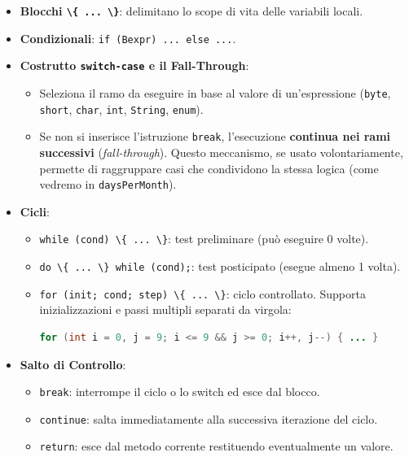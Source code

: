 \documentclass[11pt,a4paper]{article}
\newcommand{\passthrough}[1]{#1}
\providecommand{\tightlist}{\setlength{\itemsep}{0pt}\setlength{\parskip}{0pt}}
\begin{document}
\begin{itemize}
\tightlist
\item
  \textbf{Blocchi \passthrough{\lstinline!\{ ... \}!}}: delimitano lo
  scope di vita delle variabili locali.
\item
  \textbf{Condizionali}:
  \passthrough{\lstinline!if (Bexpr) ... else ...!}.
\item
  \textbf{Costrutto \passthrough{\lstinline!switch-case!} e il
  Fall-Through}:

  \begin{itemize}
  \tightlist
  \item
    Seleziona il ramo da eseguire in base al valore di un'espressione
    (\passthrough{\lstinline!byte!}, \passthrough{\lstinline!short!},
    \passthrough{\lstinline!char!}, \passthrough{\lstinline!int!},
    \passthrough{\lstinline!String!}, \passthrough{\lstinline!enum!}).
  \item
    Se non si inserisce l'istruzione \passthrough{\lstinline!break!},
    l'esecuzione \textbf{continua nei rami successivi}
    (\emph{fall-through}). Questo meccanismo, se usato volontariamente,
    permette di raggruppare casi che condividono la stessa logica (come
    vedremo in \passthrough{\lstinline!daysPerMonth!}).
  \end{itemize}
\item
  \textbf{Cicli}:

  \begin{itemize}
  \item
    \passthrough{\lstinline!while (cond) \{ ... \}!}: test preliminare
    (può eseguire 0 volte).
  \item
    \passthrough{\lstinline!do \{ ... \} while (cond);!}: test
    posticipato (esegue almeno 1 volta).
  \item
    \passthrough{\lstinline!for (init; cond; step) \{ ... \}!}: ciclo
    controllato. Supporta inizializzazioni e passi multipli separati da
    virgola:

\begin{lstlisting}[language=Java]
for (int i = 0, j = 9; i <= 9 && j >= 0; i++, j--) { ... }
\end{lstlisting}
  \end{itemize}
\item
  \textbf{Salto di Controllo}:

  \begin{itemize}
  \tightlist
  \item
    \passthrough{\lstinline!break!}: interrompe il ciclo o lo switch ed
    esce dal blocco.
  \item
    \passthrough{\lstinline!continue!}: salta immediatamente alla
    successiva iterazione del ciclo.
  \item
    \passthrough{\lstinline!return!}: esce dal metodo corrente
    restituendo eventualmente un valore.
  \end{itemize}
\end{itemize}
\end{document}

